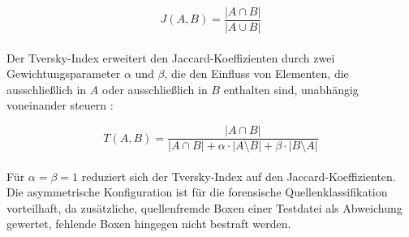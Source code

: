\begin{equation}
J(A, B) = \frac{|A \cap B|}{|A \cup B|}
\end{equation}\\

Der Tversky-Index erweitert den Jaccard-Koeffizienten durch zwei Gewichtungsparameter \(\alpha\) und \(\beta\), die den Einfluss von Elementen, die ausschließlich in \(A\) oder ausschließlich in \(B\) enthalten sind, unabhängig voneinander steuern \cite{tversky_features_1977}:

\begin{equation}
T(A, B) = \frac{|A \cap B|}{|A \cap B| + \alpha \cdot |A \setminus B| + \beta \cdot |B \setminus A|}
\end{equation}\\

Für \(\alpha = \beta = 1\) reduziert sich der Tversky-Index auf den Jaccard-Koeffizienten. Die asymmetrische Konfiguration ist für die forensische Quellenklassifikation vorteilhaft, da zusätzliche, quellenfremde Boxen einer Testdatei als Abweichung gewertet, fehlende Boxen hingegen nicht bestraft werden.